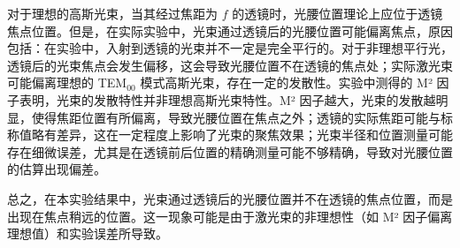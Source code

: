 对于理想的高斯光束，当其经过焦距为 \( f \) 的透镜时，光腰位置理论上应位于透镜焦点位置。但是，在实际实验中，光束通过透镜后的光腰位置可能偏离焦点，原因包括：在实验中，入射到透镜的光束并不一定是完全平行的。对于非理想平行光，透镜后的光束焦点会发生偏移，这会导致光腰位置不在透镜的焦点处；实际激光束可能偏离理想的 TEM\(_{00}\) 模式高斯光束，存在一定的发散性。实验中测得的 M² 因子表明，光束的发散特性并非理想高斯光束特性。M² 因子越大，光束的发散越明显，使得焦距位置有所偏离，导致光腰位置在焦点之外；透镜的实际焦距可能与标称值略有差异，这在一定程度上影响了光束的聚焦效果；光束半径和位置测量可能存在细微误差，尤其是在透镜前后位置的精确测量可能不够精确，导致对光腰位置的估算出现偏差。

总之，在本实验结果中，光束通过透镜后的光腰位置并不在透镜的焦点位置，而是出现在焦点稍远的位置。这一现象可能是由于激光束的非理想性（如 M² 因子偏离理想值）和实验误差所导致。
